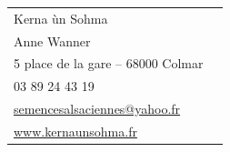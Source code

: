 \begin{longtable}{p{}p{}}
Kerna ùn Sohma & \\
Anne Wanner & \\ 
5 place de la gare – 68000 Colmar & \\
03 89 24 43 19 & \\
\href{mailto:semencesalsaciennes@yahoo.fr}{semencesalsaciennes@yahoo.fr} & \\ 
\href{www.kernaunsohma.fr}{www.kernaunsohma.fr} & \\

\end{longtable}

\vfill



